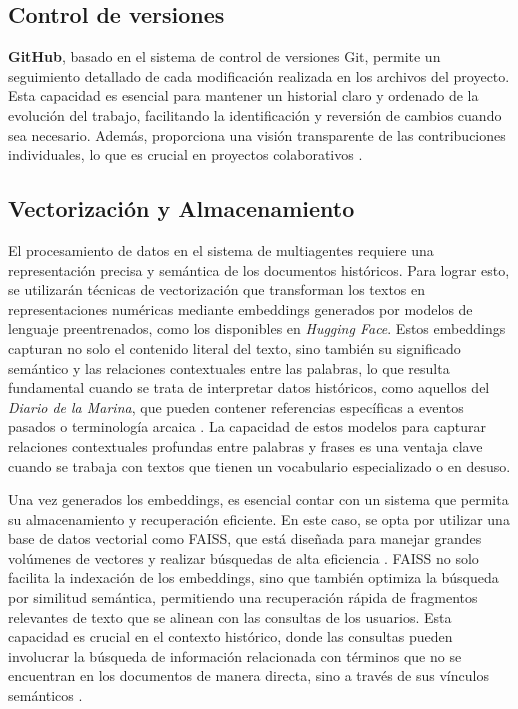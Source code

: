 \subsection{Control de versiones}

\textbf{GitHub}, basado en el sistema de control de versiones Git, permite un seguimiento detallado de cada modificación realizada en los archivos del proyecto. Esta capacidad es esencial para mantener un historial claro y ordenado de la evolución del trabajo, facilitando la identificación y reversión de cambios cuando sea necesario. Además, proporciona una visión transparente de las contribuciones individuales, lo que es crucial en proyectos colaborativos \cite{github_version_control,Beckman01012021}. 

\subsection{Vectorización y Almacenamiento}

El procesamiento de datos en el sistema de multiagentes requiere una representación precisa y semántica de los documentos históricos. Para lograr esto, se utilizarán técnicas de vectorización que transforman los textos en representaciones numéricas mediante embeddings generados por modelos de lenguaje preentrenados, como los disponibles en \textit{Hugging Face}. Estos embeddings capturan no solo el contenido literal del texto, sino también su significado semántico y las relaciones contextuales entre las palabras, lo que resulta fundamental cuando se trata de interpretar datos históricos, como aquellos del \textit{Diario de la Marina}, que pueden contener referencias específicas a eventos pasados o terminología arcaica \cite{devlin2018bert, reimers2019sentence}. La capacidad de estos modelos para capturar relaciones contextuales profundas entre palabras y frases es una ventaja clave cuando se trabaja con textos que tienen un vocabulario especializado o en desuso.

Una vez generados los embeddings, es esencial contar con un sistema que permita su almacenamiento y recuperación eficiente. En este caso, se opta por utilizar una base de datos vectorial como FAISS, que está diseñada para manejar grandes volúmenes de vectores y realizar búsquedas de alta eficiencia \cite{mikolov2013efficient}. FAISS no solo facilita la indexación de los embeddings, sino que también optimiza la búsqueda por similitud semántica, permitiendo una recuperación rápida de fragmentos relevantes de texto que se alinean con las consultas de los usuarios. Esta capacidad es crucial en el contexto histórico, donde las consultas pueden involucrar la búsqueda de información relacionada con términos que no se encuentran en los documentos de manera directa, sino a través de sus vínculos semánticos \cite{mikolov2013efficient}.

